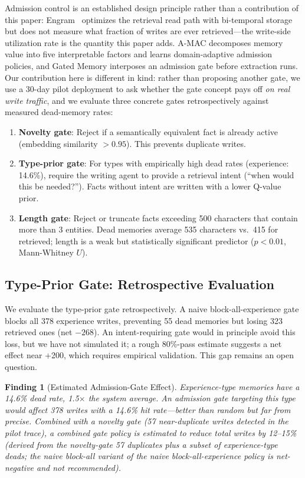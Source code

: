 \documentclass{llncs}
\newtheorem{finding}{Finding}
\begin{document}
Admission control is an established design principle rather than a contribution of this
paper: Engram~\cite{engram} optimizes the retrieval read path with bi-temporal storage but does not
measure what fraction of writes are ever retrieved---the write-side utilization rate is the
quantity this paper adds. A-MAC decomposes memory value into five interpretable factors and learns
domain-adaptive admission policies, and Gated Memory interposes an admission
gate before extraction runs. Our contribution here is different in kind: rather than proposing
another gate, we use a 30-day pilot deployment to ask whether the gate concept pays off
\emph{on real write traffic}, and we evaluate three concrete gates retrospectively against
measured dead-memory rates:

\begin{enumerate}
\item \textbf{Novelty gate}: Reject if a semantically equivalent fact is already active (embedding similarity $> 0.95$). This prevents duplicate writes.
\item \textbf{Type-prior gate}: For types with empirically high dead rates (experience: 14.6\%), require the writing agent to provide a retrieval intent (``when would this be needed?''). Facts without intent are written with a lower Q-value prior.
\item \textbf{Length gate}: Reject or truncate facts exceeding 500 characters that contain more than 3 entities. Dead memories average 535 characters vs.\ 415 for retrieved; length is a weak but statistically significant predictor ($p < 0.01$, Mann-Whitney $U$).
\end{enumerate}

\subsection{Type-Prior Gate: Retrospective Evaluation}

We evaluate the type-prior gate retrospectively. A naive block-all-experience gate blocks all 378 experience writes, preventing 55 dead memories but losing 323 retrieved ones (net $-268$). An intent-requiring gate would in principle avoid this loss, but we have not simulated it; a rough 80\%-pass estimate suggests a net effect near +200, which requires empirical validation. This gap remains an open question.



\begin{finding}[Estimated Admission-Gate Effect]
Experience-type memories have a 14.6\% dead rate, 1.5$\times$ the system average. An admission gate targeting this type would affect 378 writes with a 14.6\% hit rate---better than random but far from precise. Combined with a novelty gate (57 near-duplicate writes detected in the pilot trace), a combined gate policy is \emph{estimated} to reduce total writes by 12--15\% (derived from the novelty-gate 57 duplicates plus a subset of experience-type deads; the naive block-all variant of the naive block-all-experience policy is net-negative and not recommended).
\end{finding}
\end{document}
